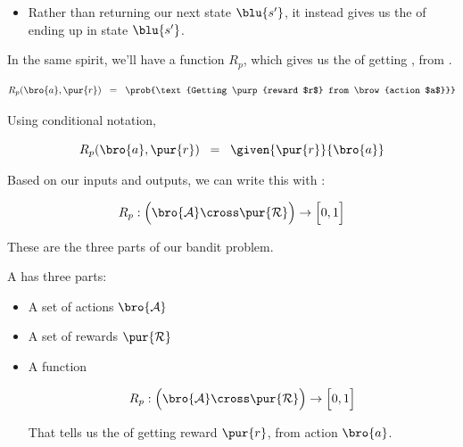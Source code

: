         

        \begin{itemize}
            \item Rather than returning our next state $\blu{s'}$, it instead gives us the  of ending up in state $\blu{s'}$.
        \end{itemize}

        In the same spirit, we'll have a function $R_p$, which gives us the  of getting , from .

        \begin{equation}
            R_p(\bro{a},\pur{r}) \;\;=\;\; \prob{\text{Getting \purp{reward $r$} from \brow{action $a$}}}
        \end{equation}

        Using conditional notation,

        \begin{equation}
            R_p(\bro{a},\pur{r}) \;\;=\;\; \given{ \pur{r} }{ \bro{a} }
        \end{equation}

        Based on our inputs and outputs, we can write this with :

        \begin{equation}
            R_p: \Big( \bro{\mathcal{A}} \cross \pur{\mathcal{R}} \Big)
            \rightarrow \Big[ 0,1 \Big]
        \end{equation}

        These are the three parts of our bandit problem.\\

        \begin{definition}
            A  has three parts:

            \begin{itemize}
                \item A set of actions $\bro{\mathcal{A}}$

                \item A set of rewards $\pur{\mathcal{R}}$

                \item A  function 

                    \begin{equation*}
                        R_p: \Big( \bro{\mathcal{A}} \cross \pur{\mathcal{R}} \Big)
                        \rightarrow \Big[ 0,1 \Big]
                    \end{equation*}

                    That tells us the  of getting reward $\pur{r}$, from action $\bro{a}$.
            \end{itemize}
        \end{definition}


